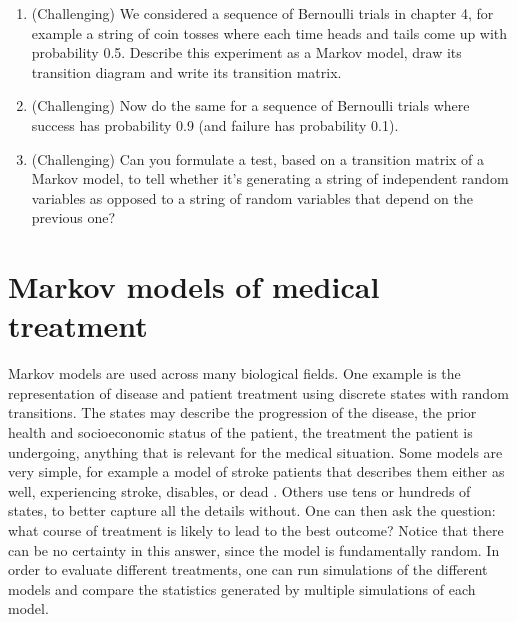 \documentclass[
  letterpaper,
  DIV=11,
  numbers=noendperiod]{scrreprt}
\begin{document}
\begin{enumerate}
  (per one microsecond): 0.04 (from R to C), 0.07 (from C to R), 0.12
  (from C to O) and 0.02 (from O to C); the other transition
  probabilities are 0. Calculate the probability of the following string
  of states: OCCR.
\item
  (Challenging) We considered a sequence of Bernoulli trials in chapter
  4, for example a string of coin tosses where each time heads and tails
  come up with probability 0.5. Describe this experiment as a Markov
  model, draw its transition diagram and write its transition matrix.
\item
  (Challenging) Now do the same for a sequence of Bernoulli trials where
  success has probability 0.9 (and failure has probability 0.1).
\item
  (Challenging) Can you formulate a test, based on a transition matrix
  of a Markov model, to tell whether it's generating a string of
  independent random variables as opposed to a string of random
  variables that depend on the previous one?
\end{enumerate}

\hypertarget{markov-models-of-medical-treatment}{%
\section{Markov models of medical
treatment}\label{markov-models-of-medical-treatment}}

\label{sec:bio10}

Markov models are used across many biological fields. One example is the
representation of disease and patient treatment using discrete states
with random transitions. The states may describe the progression of the
disease, the prior health and socioeconomic status of the patient, the
treatment the patient is undergoing, anything that is relevant for the
medical situation. Some models are very simple, for example a model of
stroke patients that describes them either as well, experiencing stroke,
disables, or dead \cite{sonnenberg_markov_1993}. Others use tens or
hundreds of states, to better capture all the details without. One can
then ask the question: what course of treatment is likely to lead to the
best outcome? Notice that there can be no certainty in this answer,
since the model is fundamentally random. In order to evaluate different
treatments, one can run simulations of the different models and compare
the statistics generated by multiple simulations of each model.
\end{document}
